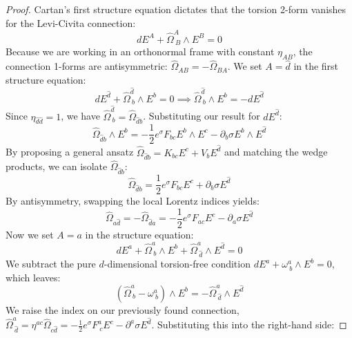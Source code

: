 \begin{tcolorbox}[breakable]
\begin{proof}
			Cartan's first structure equation dictates that the torsion 2-form vanishes for the Levi-Civita connection:
			\begin{equation}
				dE^A + \hat{\Omega}^A_{\ B} \wedge E^B = 0
			\end{equation}
			Because we are working in an orthonormal frame with constant $\eta_{AB}$, the connection 1-forms are antisymmetric: $\hat{\Omega}_{AB} = -\hat{\Omega}_{BA}$. We set $A = \hat{d}$ in the first structure equation:
			\begin{equation}
				dE^{\hat{d}} + \hat{\Omega}^{\hat{d}}_{\ b} \wedge E^b = 0 \implies \hat{\Omega}^{\hat{d}}_{\ b} \wedge E^b = -dE^{\hat{d}}
			\end{equation}
			Since $\eta_{\hat{d}\hat{d}} = 1$, we have $\hat{\Omega}^{\hat{d}}_{\ b} = \hat{\Omega}_{\hat{d}b}$. Substituting our result for $dE^{\hat{d}}$:
			\begin{equation}
				\hat{\Omega}_{\hat{d}b} \wedge E^b = -\frac{1}{2} e^\sigma F_{bc} E^b \wedge E^c - \partial_b \sigma E^b \wedge E^{\hat{d}}
			\end{equation}
			By proposing a general ansatz $\hat{\Omega}_{\hat{d}b} = K_{bc} E^c + V_b E^{\hat{d}}$ and matching the wedge products, we can isolate $\hat{\Omega}_{\hat{d}b}$:
			\begin{equation}
				\hat{\Omega}_{\hat{d}b} = \frac{1}{2} e^\sigma F_{bc} E^c + \partial_b \sigma E^{\hat{d}}
			\end{equation}
			By antisymmetry, swapping the local Lorentz indices yields:
			\begin{equation}
				\hat{\Omega}_{a\hat{d}} = -\hat{\Omega}_{\hat{d}a} = -\frac{1}{2} e^\sigma F_{ac} E^c - \partial_a \sigma E^{\hat{d}}
			\end{equation}
			Now we set $A = a$ in the structure equation:
			\begin{equation}
				dE^a + \hat{\Omega}^a_{\ b} \wedge E^b + \hat{\Omega}^a_{\ \hat{d}} \wedge E^{\hat{d}} = 0
			\end{equation}
			We subtract the pure $d$-dimensional torsion-free condition $dE^a + \omega^a_{\ b} \wedge E^b = 0$, which leaves:
			\begin{equation}
				(\hat{\Omega}^a_{\ b} - \omega^a_{\ b}) \wedge E^b = -\hat{\Omega}^a_{\ \hat{d}} \wedge E^{\hat{d}}
			\end{equation}
			We raise the index on our previously found connection, $\hat{\Omega}^a_{\ \hat{d}} = \eta^{ac}\hat{\Omega}_{c\hat{d}} = -\frac{1}{2} e^\sigma F^a_{\ c} E^c - \partial^a \sigma E^{\hat{d}}$. Substituting this into the right-hand side:

\end{proof}
\end{tcolorbox}

